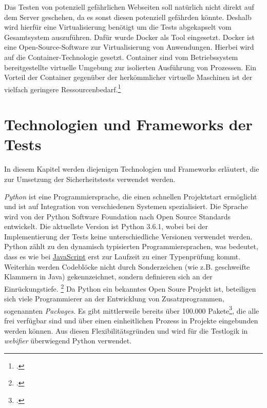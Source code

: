 Das Testen von potenziell gefährlichen Webseiten soll natürlich nicht direkt auf dem Server geschehen, da es sonst diesen potenziell gefährden könnte. Deshalb wird hierfür eine Virtualisierung benötigt um die Tests abgekapselt vom Gesamtsystem auszuführen. Dafür wurde Docker als Tool eingesetzt. Docker ist eine Open-Source-Software zur Virtualisierung von Anwendungen. Hierbei wird auf die Container-Technologie gesetzt. Container sind vom Betriebssystem bereitgestellte virtuelle Umgebung zur isolierten Ausführung von Prozessen. Ein Vorteil der Container gegenüber der herkömmlicher virtuelle Maschinen ist der vielfach geringere Ressourcenbedarf.\footcite[Vgl.][]{docker}

\section{Technologien und Frameworks der Tests}

In diesem Kapitel werden diejenigen Technologien und Frameworks erläutert, die zur Umsetzung der Sicherheitstests verwendet werden.

\textit{Python} ist eine Programmiersprache, die einen schnellen Projektstart ermöglicht und ist auf Integration von verschiedenen Systemen spezialisiert.
Die Sprache wird von der Python Software Foundation nach Open Source Standards entwickelt.
Die aktuellste Version ist Python 3.6.1, wobei bei der Implementierung der Tests keine unterschiedliche Versionen verwendet werden.
Python zählt zu den dynamisch typisierten Programmiersprachen, was bedeutet, dass es wie bei \hyperref[par:javascript]{JavaScript} erst zur Laufzeit zu einer Typenprüfung kommt.
Weiterhin werden Codeblöcke nicht durch Sonderzeichen (wie z.B. geschweifte Klammern in Java) gekennzeichnet, sondern definieren sich an der Einrückungstiefe.
\footcite[Vgl.][]{pythonHomepage}
Da Python ein bekanntes Open Soure Projekt ist, beteiligen sich viele Programmierer an der Entwicklung von Zusatzprogrammen, sogenannten \textit{Packages}.
Es gibt mittlerweile bereits über 100.000 Pakete\footcite[Vgl.][]{pypi}, die alle frei verfügbar sind und über einen einheitlichen Prozess in Projekte eingebunden werden können.
Aus diesen Flexibilitätsgründen und wird für die Testlogik in \textit{webifier} überwiegend Python verwendet.

